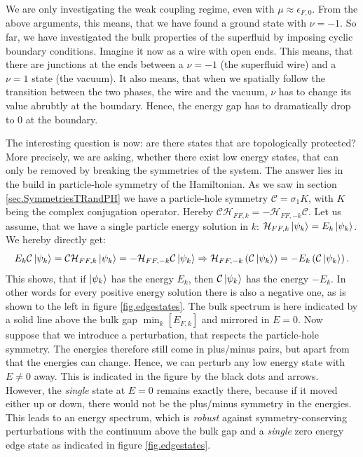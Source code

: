We are only investigating the weak coupling regime, even with $\mu \approx \epsilon_{F,0}$. From the above arguments, this means, that we have found a ground state with $\nu = -1$. So far, we have investigated the bulk properties of the superfluid by imposing cyclic boundary conditions. Imagine it now as a wire with open ends. This means, that there are junctions at the ends between a $\nu = -1$ (the superfluid wire) and a $\nu = 1$ state (the vacuum). It also means, that when we spatially follow the transition between the two phases, the wire and the vacuum, $\nu$ has to change its value abrubtly at the boundary. Hence, the energy gap has to dramatically drop to $0$ at the boundary. 

The interesting question is now: are there states that are topologically protected? More precisely, we are asking, whether there exist low energy states, that can only be removed by breaking the symmetries of the system. The answer lies in the build in particle-hole symmetry of the Hamiltonian. As we saw in section \ref{sec.SymmetriesTRandPH} we have a particle-hole symmetry $\mathcal{C} = \sigma_1 K$, with $K$ being the complex conjugation operator. Hereby $\mathcal{C}\mathcal{H}_{FF,k} = -\mathcal{H}_{FF,-k}\mathcal{C}$. Let us assume, that we have a single particle energy solution in $k$: $\mathcal{H}_{FF,k}\ket{\psi_k} = E_k\ket{\psi_k}$. We hereby directly get:
\begin{equation}
E_k\mathcal{C}\ket{\psi_k} = \mathcal{C}\mathcal{H}_{FF,k}\ket{\psi_k} = -\mathcal{H}_{FF,-k}\mathcal{C}\ket{\psi_k} \Rightarrow \mathcal{H}_{FF,-k}\left(\mathcal{C}\ket{\psi_k}\right) = -E_k\left(\mathcal{C}\ket{\psi_k}\right).
\end{equation}
This shows, that if $\ket{\psi_k}$ has the energy $E_k$, then $\mathcal{C}\ket{\psi_k}$ has the energy $-E_k$. In other words for every positive energy solution there is also a negative one, as is shown to the left in figure \ref{fig.edgestates}. The bulk spectrum is here indicated by a solid line above the bulk gap $\min_k[E_{F,k}]$ and mirrored in $E = 0$. Now suppose that we introduce a perturbation, that respects the particle-hole symmetry. The energies therefore still come in plus/minus pairs, but apart from that the energies can change. Hence, we can perturb any low energy state with $E \neq 0 $ away. This is indicated in the figure by the black dots and arrows. However, the \textit{single} state at $E = 0$ remains exactly there, because if it moved either up or down, there would not be the plus/minus symmetry in the energies. This leads to an energy spectrum, which is \textit{robust} against symmetry-conserving perturbations with the continuum above the bulk gap and a \textit{single} zero energy edge state as indicated in figure \ref{fig.edgestates}. 

